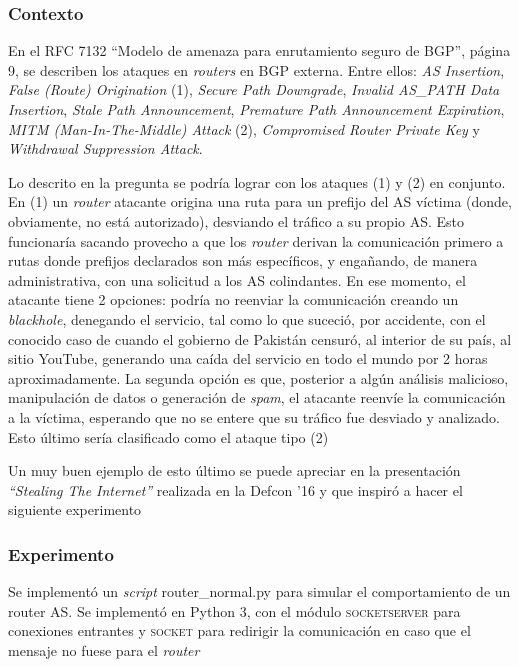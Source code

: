 \documentclass{article}
\begin{document}
\subsubsection{Contexto}
En el RFC 7132 ``Modelo de amenaza para enrutamiento seguro de BGP''\cite{rfc7132}, página 9, se describen los ataques en \textit{routers} en BGP externa. Entre ellos: \textit{AS Insertion}, \textit{False (Route) Origination} (1), \textit{Secure Path Downgrade}, \textit{Invalid AS\_PATH Data Insertion}, \textit{Stale Path Announcement}, \textit{Premature Path Announcement Expiration}, \textit{MITM (Man-In-The-Middle) Attack} (2), \textit{Compromised Router Private Key} y \textit{Withdrawal Suppression Attack}.

Lo descrito en la pregunta se podría lograr con los ataques (1) y (2) en conjunto. En (1) un \textit{router} atacante origina una ruta para un prefijo del AS víctima (donde, obviamente, no está autorizado), desviando el tráfico a su propio AS. Esto funcionaría sacando provecho a que los \textit{router} derivan la comunicación primero a rutas donde prefijos declarados son más específicos, y engañando, de manera administrativa, con una solicitud a los AS colindantes. En ese momento, el atacante tiene 2 opciones: podría no reenviar la comunicación creando un \textit{blackhole}, denegando el servicio, tal como lo que suceció, por accidente, con el conocido caso de cuando el gobierno de Pakistán censuró, al interior de su país, al sitio YouTube, generando una caída del servicio en todo el mundo por 2 horas aproximadamente. La segunda opción es que, posterior a algún análisis malicioso, manipulación de datos o generación de \textit{spam}, el atacante reenvíe la comunicación a la víctima, esperando que no se entere que su tráfico fue desviado y analizado. Esto último sería clasificado como el ataque tipo (2)

Un muy buen ejemplo de esto último se puede apreciar en la presentación \textit{``Stealing The Internet''} realizada en la Defcon '16\cite{defcon16} y que inspiró a hacer el siguiente experimento

\subsubsection{Experimento}

Se implementó un \textit{script} router\_normal.py para simular el comportamiento de un router AS. Se implementó en Python 3, con el módulo \textsc{socketserver} para conexiones entrantes y \textsc{socket} para redirigir la comunicación en caso que el mensaje no fuese para el \textit{router}
\end{document}
